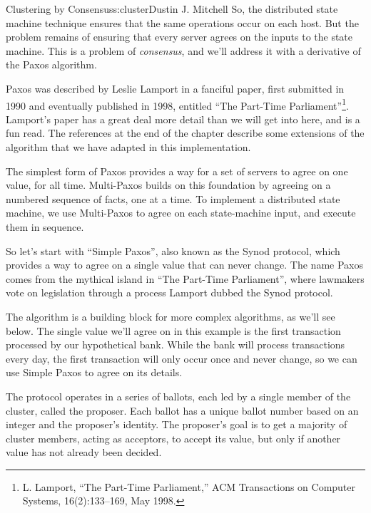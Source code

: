 \begin{aosachapter}{Clustering by Consensus}{s:cluster}{Dustin J. Mitchell}
So, the distributed state machine technique ensures that the same
operations occur on each host. But the problem remains of ensuring that
every server agrees on the inputs to the state machine. This is a
problem of \emph{consensus}, and we'll address it with a derivative of
the Paxos algorithm.

\label{consensus-by-paxos}

Paxos was described by Leslie Lamport in a fanciful paper, first
submitted in 1990 and eventually published in 1998, entitled ``The
Part-Time Parliament''\footnote{L. Lamport, ``The Part-Time
  Parliament,'' ACM Transactions on Computer Systems, 16(2):133--169,
  May 1998.}. Lamport's paper has a great deal more detail than we will
get into here, and is a fun read. The references at the end of the
chapter describe some extensions of the algorithm that we have adapted
in this implementation.

The simplest form of Paxos provides a way for a set of servers to agree
on one value, for all time. Multi-Paxos builds on this foundation by
agreeing on a numbered sequence of facts, one at a time. To implement a
distributed state machine, we use Multi-Paxos to agree on each
state-machine input, and execute them in sequence.

\label{simple-paxos}

So let's start with ``Simple Paxos'', also known as the Synod protocol,
which provides a way to agree on a single value that can never change.
The name Paxos comes from the mythical island in ``The Part-Time
Parliament'', where lawmakers vote on legislation through a process
Lamport dubbed the Synod protocol.

The algorithm is a building block for more complex algorithms, as we'll
see below. The single value we'll agree on in this example is the first
transaction processed by our hypothetical bank. While the bank will
process transactions every day, the first transaction will only occur
once and never change, so we can use Simple Paxos to agree on its
details.

The protocol operates in a series of ballots, each led by a single
member of the cluster, called the proposer. Each ballot has a unique
ballot number based on an integer and the proposer's identity. The
proposer's goal is to get a majority of cluster members, acting as
acceptors, to accept its value, but only if another value has not
already been decided.



\end{aosachapter}

